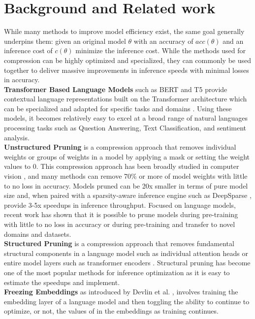 \documentclass[11pt]{article}
\begin{document}
\section{Background and Related work}
While many methods to improve model efficiency exist, the same goal generally underpins them: given an original model $\theta$ with an accuracy of $acc(\theta)$ and an inference cost of $c(\theta)$ minimize the inference cost. While the methods used for compression can be highly optimized and specialized, they can commonly be used together to deliver massive improvements in inference speeds with minimal losses in accuracy. \\
\textbf{Transformer Based Language Models} such as BERT \cite{Devlin2019BERTPO} and T5 \cite{Raffel2020ExploringTL} provide contextual language representations built on the Transformer architecture \cite{Vaswani2017AttentionIA} which can be specialized and adapted for specific tasks and domains \cite{Lee2020BioBERTAP}. Using these models, it becomes relatively easy to excel at a broad range of natural languages processing tasks such as Question Answering, Text Classification, and sentiment analysis. \\
\textbf{Unstructured Pruning} is a compression approach that removes individual weights or groups of weights in a model by applying a mask or setting the weight values to 0. This compression approach has been broadly studied in computer vision \cite{Han2015ADN}, and many methods can remove 70\% or more of model weights with little to no loss in accuracy. Models pruned can be 20x smaller in terms of pure model size and, when paired with a sparsity-aware inference engine such as DeepSparse \cite{deepsparse}, provide 3-5x speedups in inference throughput. Focused on language models, recent work has shown that it is possible to prune models during pre-training with little to no loss in accuracy \cite{Sanh2020MovementPA} \cite{Kurti2022TheOB} or during pre-training \cite{Zafrir2021PruneOF} and transfer to novel domains \cite{Campos2022SparseBERTSM} and datasets. \\
\textbf{Structured Pruning} is a compression approach that removes fundamental structural components in a language model such as individual attention heads \cite{Voita2019AnalyzingMS} or entire model layers such as transformer encoders \cite{sanh2019distilbert}. Structural pruning has become one of the most popular methods for inference optimization as it is easy to estimate the speedups and implement.\\
\textbf{Freezing Embeddings} as introduced by Devlin et al. \cite{Devlin2019BERTPO}, involves training the embedding layer of a language model and then toggling the ability to continue to optimize, or not, the values of in the embeddings as training continues. \\
\end{document}
